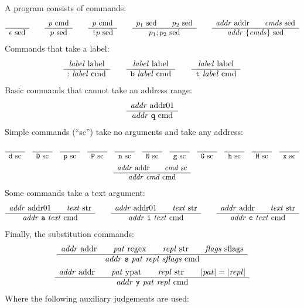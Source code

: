 \documentclass[11pt]{article}
\newcommand\RULE[2]{\begin{array}{c} #1 \\ \hline #2 \end{array}}
\newcommand\J[1]{\ensuremath{\text{ #1}}}
\begin{document}
A program consists of commands:
\begin{gather*}
	\RULE{}{\epsilon \J{sed}} \qquad
	\RULE{p \J{cmd}}{p \J{sed}} \qquad
	\RULE{p \J{cmd}}{\cmd{!} p \J{sed}} \qquad
	\RULE{p_1 \J{sed} \qquad p_2 \J{sed}}{p_1 ; p_2 \J{sed}} \qquad
	\RULE{\arg{addr} \J{addr} \qquad \arg{cmds} \J{sed}}{\arg{addr}\ \{ \arg{cmds} \} \J{sed}}
\end{gather*}
Commands that take a label:
\begin{gather*}
	\RULE{\arg{label} \J{label}}{: \arg{label} \J{cmd}} \qquad
	\RULE{\arg{label} \J{label}}{\cmd{b}\ \arg{label} \J{cmd}} \qquad
	\RULE{\arg{label} \J{label}}{\cmd{t}\ \arg{label} \J{cmd}}
\end{gather*}
Basic commands that cannot take an address range:
\begin{gather*}
	\RULE{\arg{addr} \J{addr01}}{\arg{addr}\ \cmd{q} \J{cmd}}
\end{gather*}
Simple commands (``sc'') take no arguments and take any address:
\begin{gather*}
	\RULE{}{\cmd{d} \J{sc}} \quad
	\RULE{}{\cmd{D} \J{sc}} \quad
	\RULE{}{\cmd{p} \J{sc}} \quad
	\RULE{}{\cmd{P} \J{sc}} \quad
	\RULE{}{\cmd{n} \J{sc}} \quad
	\RULE{}{\cmd{N} \J{sc}} \quad
	\RULE{}{\cmd{g} \J{sc}} \quad
	\RULE{}{\cmd{G} \J{sc}} \quad
	\RULE{}{\cmd{h} \J{sc}} \quad
	\RULE{}{\cmd{H} \J{sc}} \quad
	\RULE{}{\cmd{x} \J{sc}} \\
	\RULE{\arg{addr} \J{addr} \qquad \arg{cmd} \J{sc}}{\arg{addr}\ \arg{cmd} \J{cmd}}
\end{gather*}
Some commands take a text argument:
\begin{gather*}
	\RULE{\arg{addr} \J{addr01} \qquad \arg{text} \J{str}}{\arg{addr}\ \cmd{a}\ \arg{text} \J{cmd}} \qquad
	\RULE{\arg{addr} \J{addr01} \qquad \arg{text} \J{str}}{\arg{addr}\ \cmd{i}\ \arg{text} \J{cmd}} \qquad
	\RULE{\arg{addr} \J{addr} \qquad \arg{text} \J{str}}{\arg{addr}\ \cmd{c}\ \arg{text} \J{cmd}}
\end{gather*}
Finally, the substitution commands:
\begin{gather*}
	\RULE{\arg{addr} \J{addr} \qquad \arg{pat} \J{regex} \qquad \arg{repl} \J{str} \qquad \arg{flags} \J{sflags}}{\arg{addr}\ \cmd{s}\ \arg{pat}\ \arg{repl}\ \arg{sflags} \J{cmd}} \\
	\RULE{\arg{addr} \J{addr} \qquad \arg{pat} \J{ypat} \qquad \arg{repl} \J{str} \qquad |\arg{pat}| = |\arg{repl}|}{\arg{addr}\ \cmd{y}\ \arg{pat}\ \arg{repl} \J{cmd}}
\end{gather*}
Where the following auxiliary judgements are used:
\end{document}
